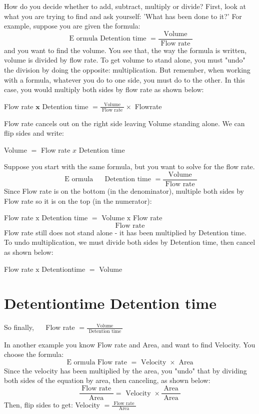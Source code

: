 \begin{enumerate}
How do you decide whether to add, subtract, multiply or divide? First, look at what you are trying to find and ask yourself: 'What has been done to it?' For example, suppose you are given the formula:
$$
\text { E ormula Detention time }=\frac{\text { Volume }}{\text { Flow rate }}
$$
and you want to find the volume. You see that, the way the formula is written, volume is divided by flow rate. To get volume to stand alone, you must "undo" the division by doing the opposite: multiplication. But remember, when working with a formula, whatever you do to one side, you must do to the other. In this case, you would multiply both sides by flow rate as shown below:

Flow rate $\mathbf{x}$ Detention time $=\frac{\text { Volume }}{\text { Flow rate }} \times$ Flowrate

Flow rate cancels out on the right side leaving Volume standing alone. We can flip sides and write:

Volume $=$ Flow rate $x$ Detention time

Suppose you start with the same formula, but you want to solve for the flow rate.
$$
\text { E ormula } \quad \text { Detention time }=\frac{\text { Volume }}{\text { Flow rate }}
$$
Since Flow rate is on the bottom (in the denominator), multiple both sides by Flow rate so it is on the top (in the numerator):

Flow rate $\mathrm{x}$ Detention time $=$ Volume $\mathrm{x}$ Flow rate
$$
\text { Flow rate }
$$
Flow rate still does not stand alone - it has been multiplied by Detention time. To undo multiplication, we must divide both sides by Detention time, then cancel as shown below:

Flow rate $\mathrm{x}$ Detentiontime $=$ Volume

\section{Detentiontime Detention time}
So finally, $\quad$ Flow rate $=\frac{\text { Volume }}{\text { Detention time }}$

In another example you know Flow rate and Area, and want to find Velocity. You choose the formula:
$$
\text { E ormula Flow rate }=\text { Velocity } \times \text { Area }
$$
Since the velocity has been multiplied by the area, you "undo" that by dividing both sides of the equation by area, then canceling, as shown below:
$$
\frac{\text { Flow rate }}{\text { Area }}=\text { Velocity } \times \frac{\text { Area }}{\text { Area }}
$$
Then, flip sides to get: Velocity $=\frac{\text { Flow rate }}{\text { Area }}$


\end{enumerate}
